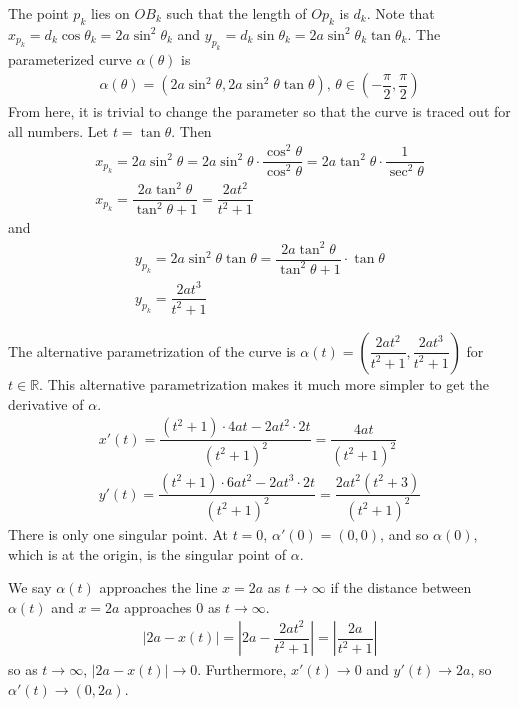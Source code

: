 \documentclass{article}
\newcommand{\R}{\mathbb{R}}
\begin{document}
	The point $p_k$ lies on $OB_k$ such that the length of $Op_k$ is $d_k$. Note that $x_{p_k} = d_k \cos \theta_k = 2a \sin^2 \theta_k$ and $y_{p_k} = d_k \sin \theta_k = 2a \sin^2 \theta_k \tan \theta_k$. The parameterized curve $\alpha(\theta)$ is
	\begin{gather*}
		\alpha(\theta) = (2a \sin^2 \theta, 2a \sin^2 \theta \tan \theta) \text{, } \theta \in \left( -\dfrac{\pi}{2}, \dfrac{\pi}{2} \right)
	\end{gather*}
	From here, it is trivial to change the parameter so that the curve is traced out for all numbers. Let $t = \tan \theta$. Then 
	\begin{gather*}
		x_{p_k} = 2a \sin^2 \theta = 2a \sin^2 \theta \cdot \dfrac{\cos^2 \theta}{\cos^2 \theta} = 2a \tan^2 \theta \cdot \dfrac{1}{\sec^2 \theta} \\
		x_{p_k}= \dfrac{2a \tan^2 \theta}{\tan^2 \theta + 1} = \dfrac{2a t^2}{t^2 + 1}
	\end{gather*}
	and
	\begin{gather*}
		y_{p_k} = 2a \sin^2 \theta \tan \theta = \dfrac{2a \tan^2 \theta}{\tan^2 \theta + 1} \cdot \tan \theta \\
		y_{p_k} = \dfrac{2at^3}{t^2 + 1}
	\end{gather*}
	
	The alternative parametrization of the curve is $\alpha(t) = \left( \dfrac{2a t^2}{t^2 + 1}, \dfrac{2at^3}{t^2 + 1} \right)$ for $t \in \R$. This alternative parametrization makes it much more simpler to get the derivative of $\alpha$.
	\begin{gather*}
		x'(t) = \dfrac{(t^2 + 1) \cdot 4at - 2at^2 \cdot 2t}{(t^2 + 1)^2} = \dfrac{4at}{(t^2 + 1)^2} \\
		y'(t) = \dfrac{(t^2 + 1) \cdot 6at^2 - 2at^3 \cdot 2t}{(t^2 + 1)^2} = \dfrac{2at^2(t^2 + 3)}{(t^2 + 1)^2}
	\end{gather*}
	There is only one singular point. At $t = 0$, $\alpha'(0) = (0, 0)$, and so $\alpha(0)$, which is at the origin, is the singular point of $\alpha$.
	
	We say $\alpha(t)$ approaches the line $x = 2a$ as $t \to \infty$ if the distance between $\alpha(t)$ and $x = 2a$ approaches $0$ as $t \to \infty$.
	\begin{gather*}
		\left| 2a - x(t) \right| = \left| 2a - \dfrac{2a t^2}{t^2 + 1} \right| = \left| \dfrac{2a}{t^2 + 1} \right|
	\end{gather*}
	so as $t \to \infty$, $| 2a - x(t) | \to 0$. Furthermore, $x'(t) \to 0$ and $y'(t) \to 2a$, so $\alpha'(t) \to (0, 2a)$.
	
\end{document}

